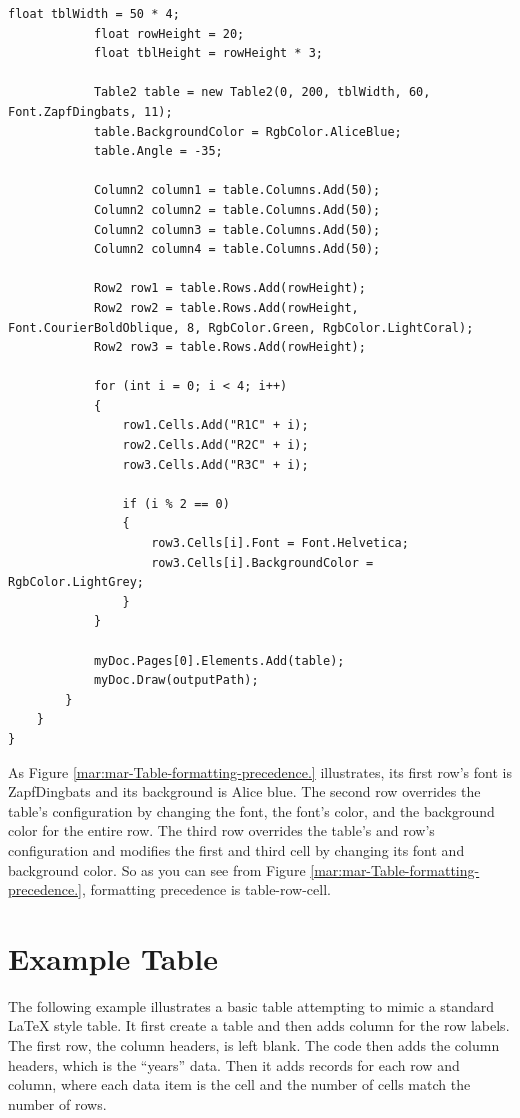 \documentclass[american,letterpaper]{tufte-book}
\numberwithin{equation}{section}
\numberwithin{figure}{section}
\begin{document}
{\begin{lstlisting}[caption={Table formatting precedence.},label={lis:Table-formatting-precedence.},basicstyle={\small\ttfamily},breaklines=true]
            float tblWidth = 50 * 4;
            float rowHeight = 20;
            float tblHeight = rowHeight * 3;

            Table2 table = new Table2(0, 200, tblWidth, 60, Font.ZapfDingbats, 11);
            table.BackgroundColor = RgbColor.AliceBlue;
            table.Angle = -35;

            Column2 column1 = table.Columns.Add(50);
            Column2 column2 = table.Columns.Add(50);
            Column2 column3 = table.Columns.Add(50);
            Column2 column4 = table.Columns.Add(50);

            Row2 row1 = table.Rows.Add(rowHeight);
            Row2 row2 = table.Rows.Add(rowHeight, Font.CourierBoldOblique, 8, RgbColor.Green, RgbColor.LightCoral);
            Row2 row3 = table.Rows.Add(rowHeight);

            for (int i = 0; i < 4; i++)
            {
                row1.Cells.Add("R1C" + i);
                row2.Cells.Add("R2C" + i);
                row3.Cells.Add("R3C" + i);

                if (i % 2 == 0)
                {
                    row3.Cells[i].Font = Font.Helvetica;
                    row3.Cells[i].BackgroundColor = RgbColor.LightGrey;
                }
            }

            myDoc.Pages[0].Elements.Add(table);
            myDoc.Draw(outputPath);
        }
    }
}
\end{lstlisting}
\leavevmode\egroup

As Figure \ref{mar:mar-Table-formatting-precedence.} illustrates,
its first row's font is ZapfDingbats and its background is Alice blue.
The second row overrides the table's configuration by changing the
font, the font's color, and the background color for the entire row.
The third row overrides the table's and row's configuration and modifies
the first and third cell by changing its font and background color.
So as you can see from Figure \ref{mar:mar-Table-formatting-precedence.},
formatting precedence is table-row-cell.

\section{Example Table}

The following example illustrates a basic table attempting to mimic
a standard LaTeX style table. It first create a table and then adds
column for the row labels. The first row, the column headers, is left
blank. The code then adds the column headers, which is the ``years''
data. Then it adds records for each row and column, where each data
item is the cell and the number of cells match the number of rows.

}
\end{document}
